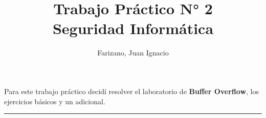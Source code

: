 \documentclass[11pt]{article}
\title{
    Trabajo Práctico  N° 2 \\
    \large Seguridad Informática}
\author{Farizano, Juan Ignacio}
\date{}
\begin{document}
Para este trabajo práctico decidí resolver el laboratorio de \textbf{Buffer Overflow}, los
ejercicios básicos y un adicional.

\maketitle

\rule{\textwidth}{1pt}
\end{document}
